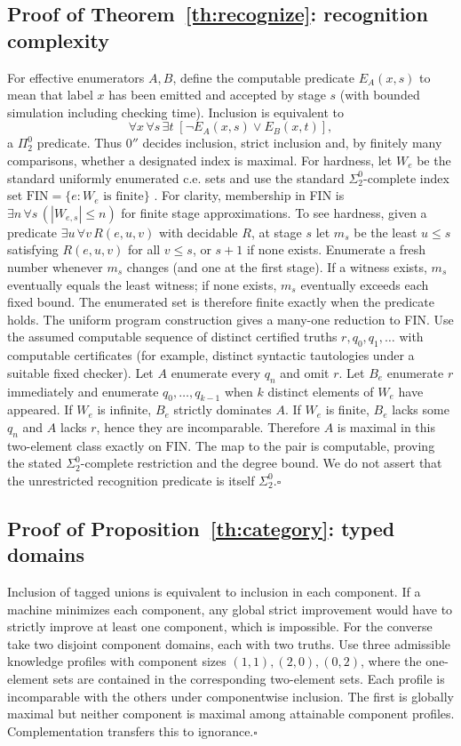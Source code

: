 \documentclass[11pt]{article}
\begin{document}
\subsection{Proof of Theorem~\ref{th:recognize}: recognition complexity}
For effective enumerators $A,B$, define the computable predicate $E_A(x,s)$ to mean that label $x$ has been emitted and accepted by stage $s$ (with bounded simulation including checking time). Inclusion is equivalent to
\[
\forall x\,\forall s\,\exists t\;[\neg E_A(x,s)\lor E_B(x,t)],
\]
a $\Pi^0_2$ predicate. Thus $0''$ decides inclusion, strict inclusion and, by finitely many comparisons, whether a designated index is maximal. For hardness, let $W_e$ be the standard uniformly enumerated c.e. sets and use the standard $\Sigma^0_2$-complete index set $\mathrm{FIN}=\{e:W_e\text{ is finite}\}$ \cite{soare}. For clarity, membership in FIN is $\exists n\,\forall s\,(|W_{e,s}|\le n)$ for finite stage approximations. To see hardness, given a predicate $\exists u\,\forall v\,R(e,u,v)$ with decidable $R$, at stage $s$ let $m_s$ be the least $u\le s$ satisfying $R(e,u,v)$ for all $v\le s$, or $s+1$ if none exists. Enumerate a fresh number whenever $m_s$ changes (and one at the first stage). If a witness exists, $m_s$ eventually equals the least witness; if none exists, $m_s$ eventually exceeds each fixed bound. The enumerated set is therefore finite exactly when the predicate holds. The uniform program construction gives a many-one reduction to FIN. Use the assumed computable sequence of distinct certified truths $r,q_0,q_1,\ldots$ with computable certificates (for example, distinct syntactic tautologies under a suitable fixed checker). Let $A$ enumerate every $q_n$ and omit $r$. Let $B_e$ enumerate $r$ immediately and enumerate $q_0,\ldots,q_{k-1}$ when $k$ distinct elements of $W_e$ have appeared. If $W_e$ is infinite, $B_e$ strictly dominates $A$. If $W_e$ is finite, $B_e$ lacks some $q_n$ and $A$ lacks $r$, hence they are incomparable. Therefore $A$ is maximal in this two-element class exactly on $\mathrm{FIN}$. The map to the pair is computable, proving the stated $\Sigma^0_2$-complete restriction and the degree bound. We do not assert that the unrestricted recognition predicate is itself $\Sigma^0_2$.\hfill$\square$

\subsection{Proof of Proposition~\ref{th:category}: typed domains}
Inclusion of tagged unions is equivalent to inclusion in each component. If a machine minimizes each component, any global strict improvement would have to strictly improve at least one component, which is impossible. For the converse take two disjoint component domains, each with two truths. Use three admissible knowledge profiles with component sizes $(1,1),(2,0),(0,2)$, where the one-element sets are contained in the corresponding two-element sets. Each profile is incomparable with the others under componentwise inclusion. The first is globally maximal but neither component is maximal among attainable component profiles. Complementation transfers this to ignorance.\hfill$\square$
\end{document}
